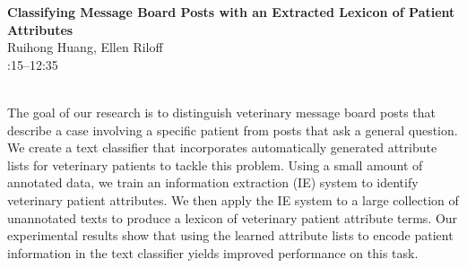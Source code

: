 \documentclass[twoside,makeidx]{book}
\renewcommand{\normalsize}{\fontsize{8}{9}\selectfont}
\renewcommand{\small}{\fontsize{7}{8}\selectfont}
\begin{document}
\par\vspace{2em}\noindent%
\begin{minipage}{\linewidth}%
\begin{center}
\textbf{\normalsize Classifying Message Board Posts with an Extracted Lexicon of Patient Attributes}\\
\normalsize  Ruihong Huang,  Ellen Riloff\\
{\small 12:15--12:35}\\
\end{center}
\end{minipage}\\[0.5em]
\nopagebreak%
\noindent%
{\small The goal of our research is to distinguish veterinary message board posts that describe a case involving a specific patient from posts that ask a general question. We create a text classifier that incorporates automatically generated attribute lists for veterinary patients to tackle this problem. Using a small amount of annotated data, we train an information extraction (IE) system to identify veterinary patient attributes. We then apply the IE system to a large collection of unannotated texts to produce a lexicon of veterinary patient attribute terms. Our experimental results show that using the learned attribute lists to encode patient information in the text classifier yields improved performance on this task.}
\clearpage
\end{document}
